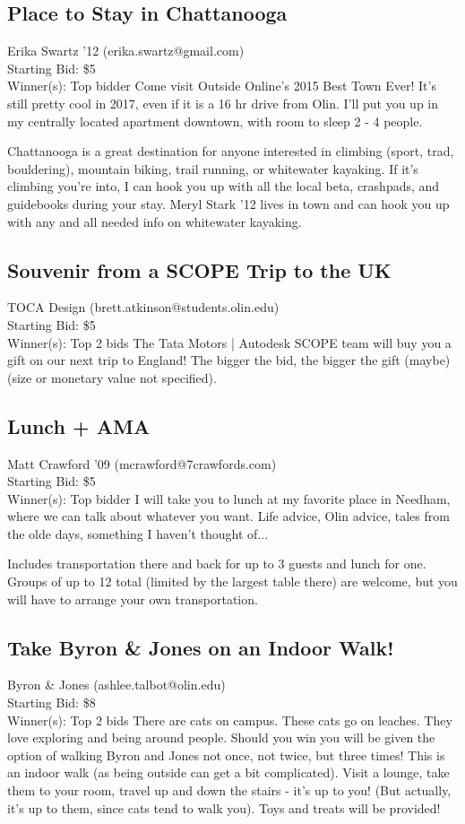 \documentclass[11pt]{article}
\begin{document}
\subsection{Place to Stay in Chattanooga}
Erika Swartz '12 (erika.swartz@gmail.com) \\
Starting Bid: \$5 \\
Winner(s): 
Top bidder\newline
Come visit Outside Online's 2015 Best Town Ever! It's still pretty cool in 2017, even if it is a 16 hr drive from Olin. I'll put you up in my centrally located apartment downtown, with room to sleep 2 - 4 people. 

Chattanooga is a great destination for anyone interested in climbing (sport, trad, bouldering), mountain biking, trail running, or whitewater kayaking. If it's climbing you're into, I can hook you up with all the local beta, crashpads, and guidebooks during your stay. Meryl Stark '12 lives in town and can hook you up with any and all needed info on whitewater kayaking.
\subsection{Souvenir from a SCOPE Trip to the UK}
TOCA Design (brett.atkinson@students.olin.edu) \\
Starting Bid: \$5 \\
Winner(s): 
Top 2 bids\newline
The Tata Motors | Autodesk SCOPE team will buy you a gift on our next trip to England! The bigger the bid, the bigger the gift (maybe) (size or monetary value not specified).
\subsection{Lunch + AMA}
Matt Crawford '09 (mcrawford@7crawfords.com) \\
Starting Bid: \$5 \\
Winner(s): 
Top bidder\newline
I will take you to lunch at my favorite place in Needham, where we can talk about whatever you want.  Life advice, Olin advice, tales from the olde days, something I haven't thought of...

Includes transportation there and back for up to 3 guests and lunch for one.  Groups of up to 12 total (limited by the largest table there) are welcome, but you will have to arrange your own transportation.
\subsection{Take Byron \& Jones on an Indoor Walk!}
Byron \& Jones  (ashlee.talbot@olin.edu) \\
Starting Bid: \$8 \\
Winner(s): 
Top 2 bids\newline
There are cats on campus. These cats go on leaches. They love exploring and being around people. Should you win you will be given the option of walking Byron and Jones not once, not twice, but three times! This is an indoor walk (as being outside can get a bit complicated). Visit a lounge, take them to your room, travel up and down the stairs - it's up to you! (But actually, it's up to them, since cats tend to walk you). Toys and treats will be provided!
\end{document}
